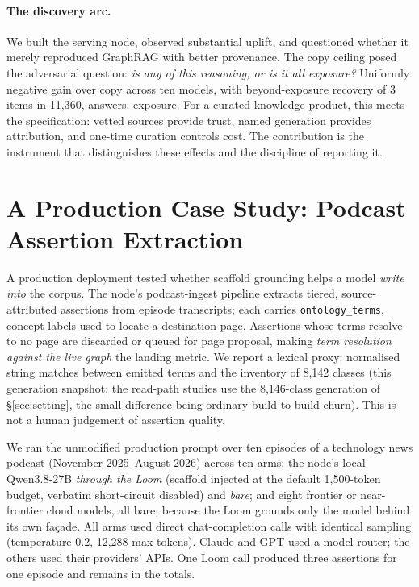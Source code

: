 \documentclass[10pt,twocolumn]{article}
\begin{document}
\paragraph{The discovery arc.} We built the serving node, observed substantial uplift, and questioned whether it merely reproduced GraphRAG with better provenance. The copy ceiling posed the adversarial question: \emph{is any of this reasoning, or is it all exposure?} Uniformly negative gain over copy across ten models, with beyond-exposure recovery of 3 items in 11{,}360, answers: exposure. For a curated-knowledge product, this meets the specification: vetted sources provide trust, named generation provides attribution, and one-time curation controls cost. The contribution is the instrument that distinguishes these effects and the discipline of reporting it.


\section{A Production Case Study: Podcast Assertion Extraction}\label{sec:casestudy}
A production deployment tested whether scaffold grounding helps a model \emph{write into} the
corpus. The node's podcast-ingest pipeline extracts tiered, source-attributed assertions from
episode transcripts; each carries \texttt{ontology\_terms}, concept labels used to locate a
destination page. Assertions whose terms resolve to no page are discarded or queued for page
proposal, making \emph{term resolution against the live graph} the landing metric. We report a
lexical proxy: normalised string matches between emitted terms and the inventory of 8{,}142
classes (this generation snapshot; the read-path studies use the 8{,}146-class generation of
\S\ref{sec:setting}, the small difference being ordinary build-to-build churn). This is not a
human judgement of assertion quality.

We ran the unmodified production prompt over ten episodes of a technology news podcast
(November 2025--August 2026) across ten arms: the node's local Qwen3.8-27B \emph{through the
Loom} (scaffold injected at the default 1{,}500-token budget, verbatim short-circuit disabled)
and \emph{bare}; and eight frontier or near-frontier cloud models, all bare, because the Loom
grounds only the model behind its own fa\c{c}ade. All arms used direct chat-completion calls
with identical sampling (temperature 0.2, 12{,}288 max tokens). Claude and GPT used a model
router; the others used their providers' APIs. One Loom call produced three assertions for one
episode and remains in the totals.
\end{document}
